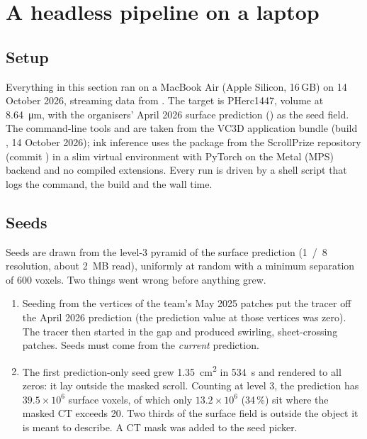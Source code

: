 \section{A headless pipeline on a laptop}
\label{sec:pipeline}

\subsection{Setup}
Everything in this section ran on a MacBook Air (Apple Silicon, 16\,GB) on 14 October 2026, streaming data from . The target is PHerc1447, volume  at \SI{8.64}{\um}, with the organisers' April 2026 surface prediction (\allowbreak{}) as the seed field. The command-line tools  and  are taken from the VC3D application bundle (build , 14 October 2026); ink inference uses the  package from the ScrollPrize  repository (commit ) in a slim virtual environment with PyTorch on the Metal (MPS) backend and no compiled extensions. Every run is driven by a shell script that logs the command, the build and the wall time.

\subsection{Seeds}
Seeds are drawn from the level-3 pyramid of the surface prediction (\SI{1}{/8} resolution, about \SI{2}{MB} read), uniformly at random with a minimum separation of 600 voxels. Two things went wrong before anything grew.

\begin{enumerate}
\item Seeding from the vertices of the team's May 2025 patches put the tracer off the April 2026 prediction (the prediction value at those vertices was zero). The tracer then started in the gap and produced swirling, sheet-crossing patches. Seeds must come from the \emph{current} prediction.
\item The first prediction-only seed grew \SI{1.35}{cm^2} in \SI{534}{s} and rendered to all zeros: it lay outside the masked scroll. Counting at level 3, the prediction has $39.5\times10^6$ surface voxels, of which only $13.2\times10^6$ (34\,\%) sit where the masked CT exceeds 20. Two thirds of the surface field is outside the object it is meant to describe. A CT mask was added to the seed picker.
\end{enumerate}

